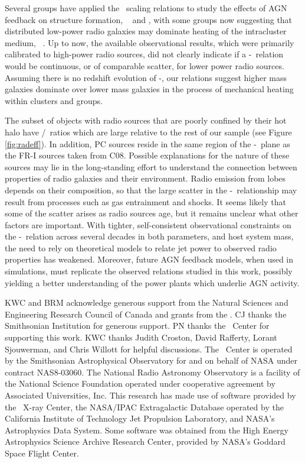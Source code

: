 \documentclass{emulateapj}
\begin{document}
Several groups have applied the \birzan\ scaling relations to study
the effects of AGN feedback on structure formation,
\eg\ \citet{best07} and \citet{2007MNRAS.379..260M}, with some groups
now suggesting that distributed low-power radio galaxies may dominate
heating of the intracluster medium,
\eg\ \citet{2009ApJ...705..854H}. Up to now, the available
observational results, which were primarily calibrated to high-power
radio sources, did not clearly indicate if a \pjet-\prad\ relation
would be continuous, or of comparable scatter, for lower power radio
sources. Assuming there is no redshift evolution of \pjet-\prad, our
relations suggest higher mass galaxies dominate over lower mass
galaxies in the process of mechanical heating within clusters and
groups.

The subset of objects with radio sources that are poorly confined by
their hot halo have \pjet/\prad\ ratios which are large relative to
the rest of our sample (see Figure \ref{fig:radeff}). In addition, PC
sources reside in the same region of the \pjet-\prad\ plane as the
FR-I sources taken from C08. Possible explanations for the nature of
these sources may lie in the long-standing effort to understand the
connection between properties of radio galaxies and their
environment. Radio emission from lobes depends on their composition,
so that the large scatter in the \pjet-\prad\ relationship may result
from processes such as gas entrainment and shocks. It seems likely
that some of the scatter arises as radio sources age, but it remains
unclear what other factors are important. With tighter,
self-consistent observational constraints on the \pjet-\prad\ relation
across several decades in both parameters, and host system mass, the
need to rely on theoretical models to relate jet power to observed
radio properties has weakened. Moreover, future AGN feedback models,
when used in simulations, must replicate the observed relations
studied in this work, possibly yielding a better understanding of the
power plants which underlie AGN activity.

\acknowledgements

KWC and BRM acknowledge generous support from the Natural Sciences and
Engineering Research Council of Canada and grants from the \cxo. CJ
thanks the Smithsonian Institution for generous support. PN thanks the
\cxo\ Center for supporting this work. KWC thanks Judith Croston,
David Rafferty, Lorant Sjouwerman, and Chris Willott for helpful
discussions. The \cxo\ Center is operated by the Smithsonian
Astrophysical Observatory for and on behalf of NASA under contract
NAS8-03060. The National Radio Astronomy Observatory is a facility of
the National Science Foundation operated under cooperative agreement
by Associated Universities, Inc. This research has made use of
software provided by the \chandra\ X-ray Center, the NASA/IPAC
Extragalactic Database operated by the California Institute of
Technology Jet Propulsion Laboratory, and NASA's Astrophysics Data
System. Some software was obtained from the High Energy Astrophysics
Science Archive Research Center, provided by NASA's Goddard Space
Flight Center.
\end{document}
